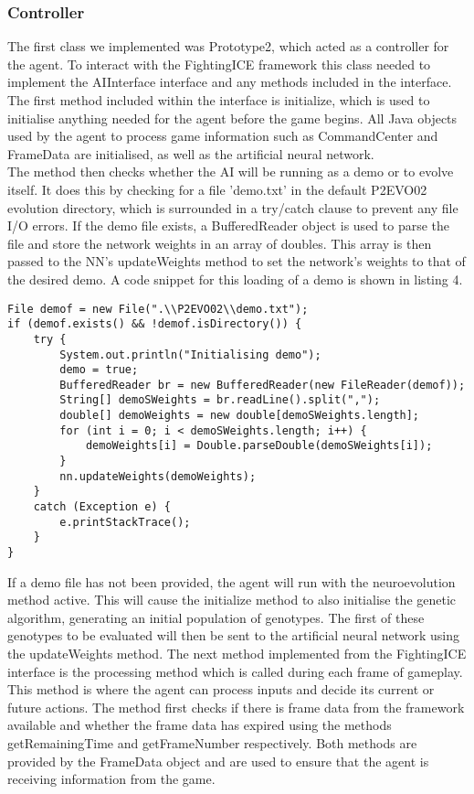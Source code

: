 \documentclass[12pt,a4paper]{article}
\begin{document}
\subsubsection*{Controller}
The first class we implemented was Prototype2, which acted as a controller for the agent. To interact with the FightingICE framework this class needed to implement the AIInterface interface and any methods included in the interface.\\

The first method included within the interface is initialize, which is used to initialise anything needed for the agent before the game begins. All Java objects used by the agent to process game information such as CommandCenter and FrameData are initialised, as well as the artificial neural network.\\

The method then checks whether the AI will be running as a demo or to evolve itself. It does this by checking for a file 'demo.txt' in the default P2EVO02 evolution directory, which is surrounded in a try/catch clause to prevent any file I/O errors. If the demo file exists, a BufferedReader object is used to parse the file and store the network weights in an array of doubles. This array is then passed to the NN's updateWeights method to set the network's weights to that of the desired demo. A code snippet for this loading of a demo is shown in listing 4.
\singlespacing
\begin{lstlisting}[caption=Loading of demo files in Prototype2 class]
File demof = new File(".\\P2EVO02\\demo.txt");
if (demof.exists() && !demof.isDirectory()) {
	try {
		System.out.println("Initialising demo");
		demo = true;
		BufferedReader br = new BufferedReader(new FileReader(demof));
		String[] demoSWeights = br.readLine().split(",");
		double[] demoWeights = new double[demoSWeights.length];
		for (int i = 0; i < demoSWeights.length; i++) {
			demoWeights[i] = Double.parseDouble(demoSWeights[i]);
		}
		nn.updateWeights(demoWeights);
	}
	catch (Exception e) {
		e.printStackTrace();
	}
}
\end{lstlisting}

\onehalfspace

If a demo file has not been provided, the agent will run with the neuroevolution method active. This will cause the initialize method to also initialise the genetic algorithm, generating an initial population of genotypes. The first of these genotypes to be evaluated will then be sent to the artificial neural network using the updateWeights method.
\newpage
The next method implemented from the FightingICE interface is the processing method which is called during each frame of gameplay. This method is where the agent can process inputs and decide its current or future actions. The method first checks if there is frame data from the framework available and whether the frame data has expired using the methods getRemainingTime and getFrameNumber respectively. Both methods are provided by the FrameData object and are used to ensure that the agent is receiving information from the game.\\
\end{document}

